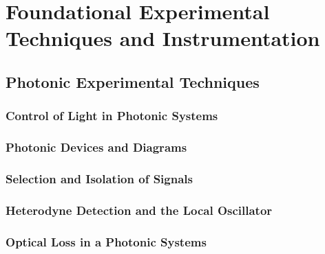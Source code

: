 \chapter{Foundational Experimental Techniques and Instrumentation}
\label{ch:Experimental}
\acresetall



\section{Photonic Experimental Techniques}
\label{sec:Experimental:Experimental Techniques}


\subsection{Control of Light in Photonic Systems}
\label{subsec:Experimental:Techniques:Control}


\subsection{Photonic Devices and Diagrams}
\label{subsec:Experimental:Techniques:Diagrams}


\subsection{Selection and Isolation of Signals}
\label{subsec:Experimental:Techniques:Signals}


\subsection{Heterodyne Detection and the Local Oscillator}
\label{subsec:Experimental:Techniques:Heterodyne}


\subsection{Optical Loss in a Photonic Systems}
\label{subsec:Experimental:Techniques:Loss}



